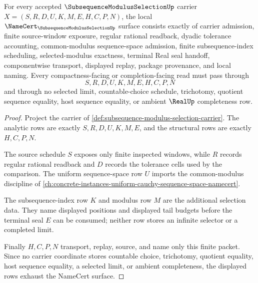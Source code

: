 \begin{theorem}
\label{thm:subsequence-modulus-selection-obligations}
For every accepted $\SubsequenceModulusSelectionUp$ carrier $X=(S,R,D,U,K,M,E,H,C,P,N)$, the local $\NameCert_{\SubsequenceModulusSelectionUp}$ surface consists exactly of carrier admission, finite source-window exposure, regular rational readback, dyadic tolerance accounting, common-modulus sequence-space admission, finite subsequence-index scheduling, selected-modulus exactness, terminal Real seal handoff, componentwise transport, displayed replay, package provenance, and local naming. Every compactness-facing or completion-facing read must pass through
$$
S,R,D,U,K,M,E,H,C,P,N
$$
and through no selected limit, countable-choice schedule, trichotomy, quotient sequence equality, host sequence equality, or ambient $\RealUp$ completeness row.
\end{theorem}
\begin{proof}
Project the carrier of \autoref{def:subsequence-modulus-selection-carrier}. The analytic rows are exactly $S,R,D,U,K,M,E$, and the structural rows are exactly $H,C,P,N$.

The source schedule $S$ exposes only finite inspected windows, while $R$ records regular rational readback and $D$ records the tolerance cells used by the comparison. The uniform sequence-space row $U$ imports the common-modulus discipline of \autoref{ch:concrete-instances-uniform-cauchy-sequence-space-namecert}.

The subsequence-index row $K$ and modulus row $M$ are the additional selection data. They name displayed positions and displayed tail budgets before the terminal seal $E$ can be consumed; neither row stores an infinite selector or a completed limit.

Finally $H,C,P,N$ transport, replay, source, and name only this finite packet. Since no carrier coordinate stores countable choice, trichotomy, quotient equality, host sequence equality, a selected limit, or ambient completeness, the displayed rows exhaust the NameCert surface.
\end{proof}


